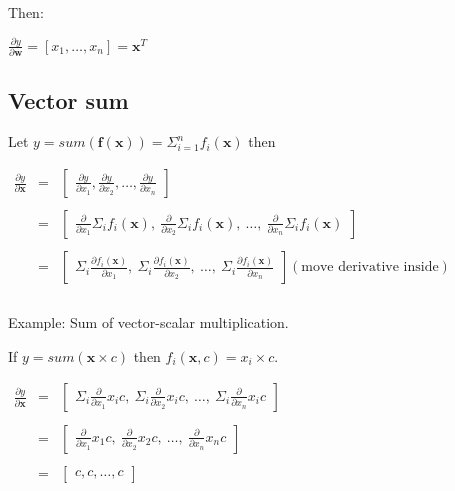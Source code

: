 \documentclass[11pt]{article}
\begin{document}
Then:

$\frac{\partial y}{\partial \mathbf{w}} = [ x_1, \ldots, x_n ] = \mathbf{x}^T$

\subsection{Vector sum}

Let $y = sum( \mathbf{f}(\mathbf{x})) = \Sigma_{i=1}^n f_i(\mathbf{x})$ then

$
\begin{array}{lcl}
\frac{\partial y}{\partial \mathbf{x}} & = & \begin{bmatrix} \frac{\partial y}{\partial x_1}, \frac{\partial y}{\partial x_2}, \ldots, \frac{\partial y}{\partial x_n} \end{bmatrix}\\\\
 & = & \begin{bmatrix} \frac{\partial}{\partial x_1} \Sigma_i f_i(\mathbf{x}),~ \frac{\partial}{\partial x_2} \Sigma_i f_i(\mathbf{x}),~ \ldots,~ \frac{\partial}{\partial x_n} \Sigma_i  f_i(\mathbf{x}) \end{bmatrix} \\\\
 & = & \begin{bmatrix} \Sigma_i \frac{\partial f_i(\mathbf{x})}{\partial x_1},~ \Sigma_i \frac{\partial f_i(\mathbf{x})}{\partial x_2},~ \ldots,~ \Sigma_i \frac{\partial f_i(\mathbf{x})}{\partial x_n}  \end{bmatrix}(\text{move derivative inside})\\\\
\end{array}
$

Example: Sum of vector-scalar multiplication.


If $y = sum(\mathbf{x} \times c)$ then $f_i(\mathbf{x},c) = x_i \times c$.

$
\begin{array}{lcl}
\frac{\partial y}{\partial \mathbf{x}} & = & \begin{bmatrix} \Sigma_i \frac{\partial}{\partial x_1} x_i c,~ \Sigma_i \frac{\partial }{\partial x_2} x_i c,~ \ldots,~ \Sigma_i \frac{\partial}{\partial x_n} x_i c  \end{bmatrix}\\\\
 & = & \begin{bmatrix} \frac{\partial}{\partial x_1} x_1 c,~ \frac{\partial }{\partial x_2} x_2 c,~ \ldots,~ \frac{\partial}{\partial x_n} x_n c  \end{bmatrix}\\\\
 & = & \begin{bmatrix} c, c, \ldots, c \end{bmatrix}\\\\
\end{array}
$
\end{document}
